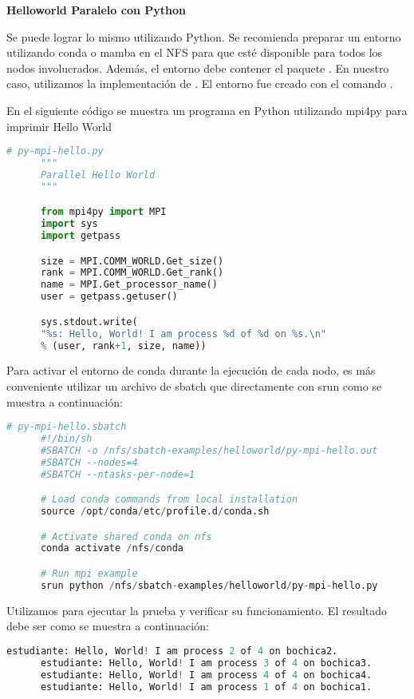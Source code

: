 \begin{spacing}{1.5}
  \textbf{Helloworld Paralelo con Python}

  Se puede lograr lo mismo utilizando Python. Se recomienda preparar un
  entorno utilizando conda o mamba en el NFS para que esté disponible para
  todos
  los nodos involucrados. Además, el entorno debe contener el paquete
  . En nuestro caso, utilizamos la implementación de .
  El entorno fue creado con el comando 
  .

  En el siguiente código se muestra un programa en Python utilizando mpi4py para imprimir Hello World

  \begin{lstlisting}[language=python]
      # py-mpi-hello.py
      """
      Parallel Hello World
      """

      from mpi4py import MPI
      import sys
      import getpass

      size = MPI.COMM_WORLD.Get_size()
      rank = MPI.COMM_WORLD.Get_rank()
      name = MPI.Get_processor_name()
      user = getpass.getuser()

      sys.stdout.write(
      "%s: Hello, World! I am process %d of %d on %s.\n"
      % (user, rank+1, size, name))

    \end{lstlisting}

  Para activar el entorno de conda durante la ejecución de cada nodo, es más conveniente utilizar un archivo de sbatch que directamente con srun como se muestra a continuación:

  \begin{lstlisting}[language=python]
      # py-mpi-hello.sbatch
      #!/bin/sh
      #SBATCH -o /nfs/sbatch-examples/helloworld/py-mpi-hello.out
      #SBATCH --nodes=4
      #SBATCH --ntasks-per-node=1

      # Load conda commands from local installation
      source /opt/conda/etc/profile.d/conda.sh

      # Activate shared conda on nfs
      conda activate /nfs/conda

      # Run mpi example
      srun python /nfs/sbatch-examples/helloworld/py-mpi-hello.py
    \end{lstlisting}

  Utilizamos  para ejecutar la prueba y verificar su funcionamiento. El resultado debe ser como se muestra a continuación:

  \begin{lstlisting}[language=python]
      estudiante: Hello, World! I am process 2 of 4 on bochica2.
      estudiante: Hello, World! I am process 3 of 4 on bochica3.
      estudiante: Hello, World! I am process 4 of 4 on bochica4.
      estudiante: Hello, World! I am process 1 of 4 on bochica1. 
      \end{lstlisting}


\end{spacing}
